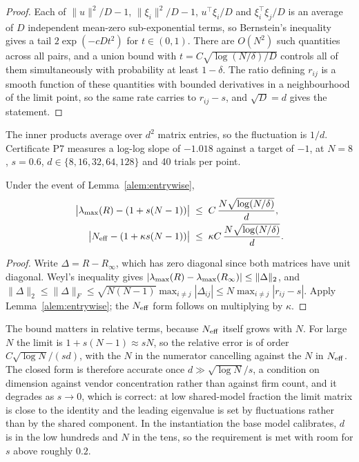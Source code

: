 \begin{proof}
Each of $\|u\|^2/D - 1$, $\|\xi_i\|^2/D - 1$, $u^{\top}\xi_i/D$ and $\xi_i^{\top}\xi_j/D$ is an average of $D$ independent mean-zero sub-exponential terms, so Bernstein's inequality gives a tail $2\exp(-cDt^2)$ for $t \in (0,1)$. There are $O(N^2)$ such quantities across all pairs, and a union bound with $t = C\sqrt{\log(N/\delta)/D}$ controls all of them simultaneously with probability at least $1-\delta$. The ratio defining $r_{ij}$ is a smooth function of these quantities with bounded derivatives in a neighbourhood of the limit point, so the same rate carries to $r_{ij}-s$, and $\sqrt{D}=d$ gives the statement.
\end{proof}

The inner products average over $d^2$ matrix entries, so the fluctuation is $1/d$. Certificate P7 measures a log-log slope of $-1.018$ against a target of $-1$, at $N=8$, $s=0.6$, $d \in \{8,16,32,64,128\}$ and 40 trials per point.

\begin{aproposition}
\label{aprop:weyl}
Under the event of Lemma~\ref{alem:entrywise},
\begin{align*}
  \big|\lambda_{\max}(R) - (1+s(N-1))\big| &\;\leq\; C\,\frac{N\sqrt{\log(N/\delta)}}{d}, \\
  \big|N_{\mathrm{eff}} - (1+\kappa s(N-1))\big| &\;\leq\; \kappa C\,\frac{N\sqrt{\log(N/\delta)}}{d}.
\end{align*}
\end{aproposition}

\begin{proof}
Write $\Delta = R - R_\infty$, which has zero diagonal since both matrices have unit diagonal. Weyl's inequality gives $|\lambda_{\max}(R)-\lambda_{\max}(R_\infty)| \leq \|\Delta\|_2$, and $\|\Delta\|_2 \leq \|\Delta\|_F \leq \sqrt{N(N-1)}\max_{i\neq j}|\Delta_{ij}| \leq N\max_{i \neq j}|r_{ij}-s|$. Apply Lemma~\ref{alem:entrywise}; the $N_{\mathrm{eff}}$ form follows on multiplying by $\kappa$.
\end{proof}

The bound matters in relative terms, because $N_{\mathrm{eff}}$ itself grows with $N$. For large $N$ the limit is $1+s(N-1) \approx sN$, so the relative error is of order $C\sqrt{\log N}/(sd)$, with the $N$ in the numerator cancelling against the $N$ in $N_{\mathrm{eff}}$. The closed form is therefore accurate once $d \gg \sqrt{\log N}/s$, a condition on dimension against vendor concentration rather than against firm count, and it degrades as $s \to 0$, which is correct: at low shared-model fraction the limit matrix is close to the identity and the leading eigenvalue is set by fluctuations rather than by the shared component. In the instantiation the base model calibrates, $d$ is in the low hundreds and $N$ in the tens, so the requirement is met with room for $s$ above roughly $0.2$.

